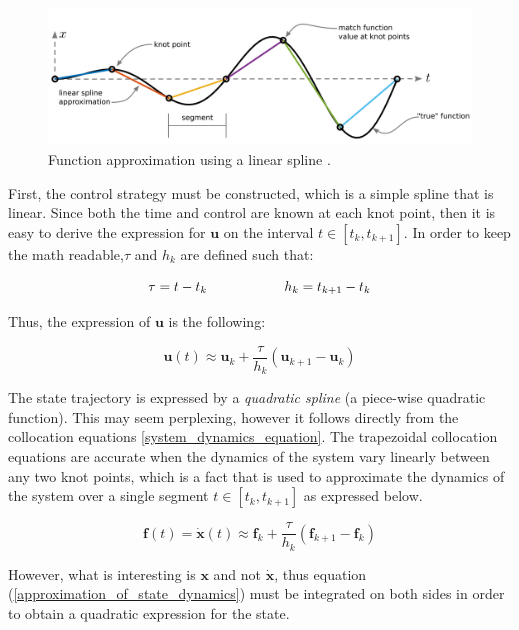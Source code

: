 \documentclass{thesisreport}
\begin{document}
 
 \begin{figure}[h]
 \centering
 \includegraphics[width=\textwidth]{Images/Trajectory/Function_approximation_a}
 \caption{Function approximation using a linear spline \cite{Kelly2017}.}
 \label{function_approximation_a}
 \end{figure}
 
 
 First, the control strategy must be constructed, which is a simple spline that is linear. Since both the time and control are known at each knot point, then it is easy to derive the expression for $\bm{u}$ on the interval $t \in [t_k,t_{k+1}]$. In order to keep the math readable,$\tau$ and $h_k$ are defined such that:
 
 \begin{equation*}
 	\tau = t-t_k \text{\hspace{2cm}}h_k = t_{k+1} - t_k
 \end{equation*}
   
 Thus, the expression of $\bm{u}$ is the following:
 
 \begin{equation}\label{spline_a}
 	\bm{u}(t) \approx \bm{u}_k + \frac{\tau}{h_k}(\bm{u}_{k+1}-\bm{u}_k)
 \end{equation}
 
 
 The state trajectory is expressed by a \textit{quadratic spline} (a piece-wise quadratic function). This may seem perplexing, however it follows directly from the collocation equations \ref{system_dynamics_equation}. The trapezoidal collocation equations are accurate when the dynamics of the system vary linearly between any two knot points, which is a fact that is used to approximate the dynamics of the system over a single segment $t \in [t_k, t_{k+1}]$ as expressed below.
 
 
 \begin{equation}\label{approximation_of_state_dynamics}
 	\bm{f}(t) = \dot{\bm{x}}(t) \approx \bm{f}_k + \frac{\tau}{h_k}(\bm{f}_{k+1}-\bm{f}_k)
 \end{equation}
 
 However, what is interesting is $\bm{x}$ and not $\dot{\bm{x}}$, thus equation (\ref{approximation_of_state_dynamics}) must be integrated on both sides in order to obtain a quadratic expression for the state.
 
\end{document}

